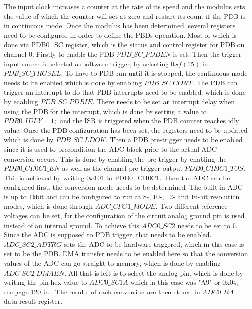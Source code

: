 The input clock increases a counter at the rate of its speed and the modulus sets the value of which the counter will set at zero and restart its count if the PDB is in continuous mode.
Once the modulus has been determined, several registers need to be configured in order to define the PBDs operation.
Most of which is done via PDB0\_SC register, which is the status and control register for PDB on channel 0.
Firstly to enable the PDB $ PDB\_SC\_PDBEN $ is set.
Then the trigger input source is selected as software trigger, by selecting $0xf (15)$ in $ PDB\_SC\_TRGSEL $.
To have to PDB run until it is stopped, the continuous mode needs to be enabled which is done by enabling $ PDB\_SC\_CONT $.
The PDB can trigger an interrupt to do that PDB interrupts need to be enabled, which is done by enabling
$ PDB\_SC\_PDBIE $.
There needs to be set an interrupt delay when using the PDB for the interrupt, which is done by setting a value to $PDB0\_IDLY = 1;$ and the ISR is triggered when the PDB counter reaches idly value.
Once the PDB configuration has been set, the registers need to be updated which is done by $ PDB\_SC\_LDOK$.
Then a PDB pre-trigger needs to be enabled since it is used to precondition the ADC block prior to the actual ADC conversion occurs.
This is done by enabling the pre-trigger by enabling the $PDB0\_CH0C1\_EN$ as well as the channel pre-trigger output $PDB0\_CH0C1\_TOS$.
This is achieved by writing $0x101$ to PDB0\_CH0C1.
Then the ADC can be configured first, the conversion mode needs to be determined.
The built-in ADC is up to 16bit and can be configured to run at 8-, 10-, 12- and 16-bit resolution modes, which is done through $ADC\_CFG1\_MODE$.
Two different reference voltages can be set, for the configuration of the circuit analog ground pin is used instead of an internal ground.
To achieve this $ADC0\_SC2$ needs to be set to 0.
Since the ADC is supposed to PDB trigger, that needs to be enabled.
$ADC\_SC2\_ADTRG$ sets the ADC to be hardware triggered, which in this case is set to be the PDB.
DMA transfer needs to be enabled here so that the conversion values of the ADC can go straight to memory, which is done by enabling  $ADC\_SC2\_DMAEN$.
All that is left is to select the analog pin, which is done by writing the pin hex value to $ADC0\_SC1A$ which in this case was "A9" or 0x04, see page 120 in \cite{freescale_semiconductor_kinetis_2021}.
The results of each conversion are then stored in $ADC0\_RA$ data result register.

